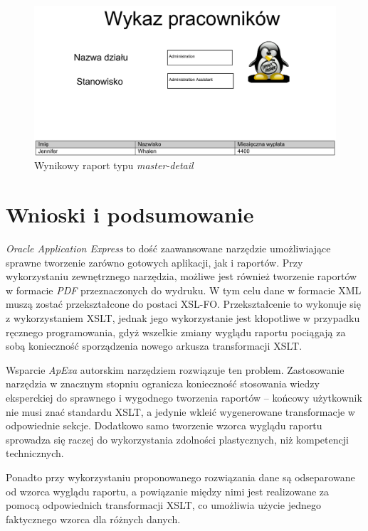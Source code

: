 \documentclass[11pt,a4paper]{article}
\begin{document}
\begin{figure}
\centering
\includegraphics[scale=0.5,angle=90]{test-md}
\caption{Wynikowy raport typu \emph{master-detail}}
\label{img:wynikowy}
\end{figure}


\clearpage


\section{Wnioski i podsumowanie}
\emph{Oracle Application Express} to dość zaawansowane narzędzie umożliwiające sprawne tworzenie zarówno gotowych aplikacji, jak i raportów. Przy wykorzystaniu zewnętrznego narzędzia, możliwe jest również tworzenie raportów w formacie \emph{PDF} przeznaczonych do wydruku. W tym celu dane w formacie XML muszą zostać przekształcone do postaci XSL-FO. Przekształcenie to wykonuje się z wykorzystaniem XSLT, jednak jego wykorzystanie jest kłopotliwe w przypadku ręcznego programowania, gdyż wszelkie zmiany wyglądu raportu pociągają za sobą konieczność sporządzenia nowego arkusza transformacji XSLT.

Wsparcie \emph{ApExa} autorskim narzędziem rozwiązuje ten problem. Zastosowanie narzędzia w znacznym stopniu ogranicza konieczność stosowania wiedzy eksperckiej do sprawnego i wygodnego tworzenia raportów -- końcowy użytkownik nie musi znać standardu XSLT, a jedynie wkleić wygenerowane transformacje w odpowiednie sekcje. Dodatkowo samo tworzenie wzorca wyglądu raportu sprowadza się raczej do wykorzystania zdolności plastycznych, niż kompetencji technicznych.

Ponadto przy wykorzystaniu proponowanego rozwiązania dane są odseparowane od wzorca wyglądu raportu, a powiązanie między nimi jest realizowane za pomocą odpowiednich transformacji XSLT, co umożliwia użycie jednego faktycznego wzorca dla różnych danych.  
\end{document}
